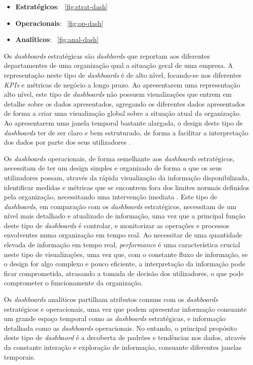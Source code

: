 \begin{itemize}
  \item \textbf{Estratégicos}: ~\ref{fig:strat-dash}
  \item \textbf{Operacionais}: ~\ref{fig:op-dash}
  \item \textbf{Analíticos}: ~\ref{fig:anal-dash}
\end{itemize}

Os \textit{dashboards} estratégicas são \textit{dashbords} que reportam aos diferentes departamentes de uma organização qual a situação geral de uma empresa. A representação neste tipo de \textit{dashboards} é de alto nível, focando-se nos diferentes \textit{KPIs} e métricas de negócio a longo prazo. Ao apresentarem uma representação alto nível, este tipo de \textit{dashboards} não possuem visualizações que entrem em detalhe sobre os dados apresentados, agregando os diferentes dados apresentados de forma a criar uma visualização global sobre a situação atual da organização. Ao apresentarem uma janela temporal bastante alargada, o design deste tipo de \textit{dashboards} ter de ser claro e bem estruturado, de forma a facilitar a interpretação dos dados por parte dos seus utilizadores \cite{pappas2011riding}. 

Os \textit{dashboards} operacionais, de forma semelhante aos \textit{dashboards} estratégicos, necessitam de ter um design simples e organizado de forma a que os seus utilizadores possam, através da rápida visualização da informação disponibilizada, identificar medidas e métricas que se encontrem fora dos limites normais definidos pela organização, necessitando uma intervenção imediata \cite{pappas2011riding}. Este tipo de \textit{dashboards}, em comparação com os \textit{dashboards} estratégicos, necessitam de um nível mais detalhado e atualizado de informação, uma vez que a principal função deste tipo de \textit{dashboards} é controlar, e monitorizar as operações e processos envolventes numa organização em tempo real. Ao necessitar de uma quantidade elevada de informação em tempo real, \textit{performance} é uma característica crucial neste tipo de visualizações, uma vez que, com o constante fluxo de informação, se o design for algo complexo e pouco eficiente, a interpretação da informação pode ficar comprometida, atrasando a tomada de decisão dos utilizadores, o que pode comprometer o funcionamente da organização.

Os \textit{dashboards} analíticos partilham atributos comuns com os \textit{dashboards} estratégicos e operacionais, uma vez que podem apresentar informação consuante um grande espaço temporal como as \textit{dashboards} estratégicas, e informação detalhada como as \textit{dashboards} operacionais. No entando, o principal propósito deste tipo de \textit{dashbaord} é a decoberta de padrões e tendências nos dados, através da constante interação e exploração de informação, consuante diferentes janelas temporais.

